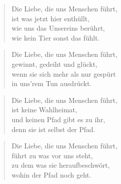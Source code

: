 \documentclass[10pt,a4paper]{article}
\begin{document}
\begin{multicols}{2}
\begin{verse}
Die Liebe, die uns Menschen führt, \\
ist was jetzt hier enthüllt, \\
wie uns das Unsereins berührt, \\
wie kein Tier sonst das fühlt. \\
\end{verse}

\begin{verse}
Die Liebe, die uns Menschen führt, \\
gewinnt, gedeiht und glückt, \\
wenn sie sich mehr als nur gespürt \\
in uns’rem Tun ausdrückt. \\
\end{verse}

\begin{verse}
Die Liebe, die uns Menschen führt, \\
ist keine Wahlheimat, \\
und keinen Pfad gibt es zu ihr, \\
denn sie ist selbst der Pfad. \\
\end{verse}

\begin{verse}
Die Liebe, die uns Menschen führt, \\
führt zu was vor uns steht, \\
zu dem was sie heraufbeschwört, \\
wohin der Pfad noch geht. \\
\end{verse}

\end{multicols}
\end{document}
